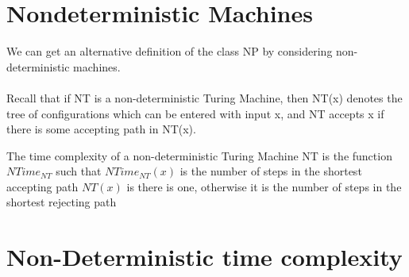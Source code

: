 \documentclass{article}[18pt]
\begin{document}
\section{Nondeterministic Machines}
We can get an alternative definition of the class NP by considering non-deterministic machines.\\
\\
Recall that if NT is a non-deterministic Turing Machine, then NT(x) denotes the tree of configurations which can be entered with input x, and NT accepts x if there is some accepting path in NT(x).
\begin{definition}
The time complexity of a non-deterministic Turing Machine NT is the function $NTime_{NT}$ such that $NTime_{NT}(x)$ is the number of steps in the shortest accepting path $NT(x)$ is there is one, otherwise it is the number of steps in the shortest rejecting path
\end{definition}
\section{Non-Deterministic time complexity}
\end{document}
